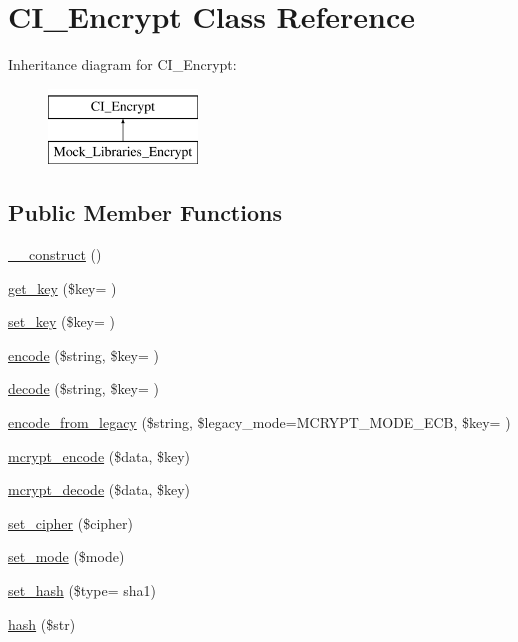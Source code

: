\hypertarget{class_c_i___encrypt}{}\section{C\+I\+\_\+\+Encrypt Class Reference}
\label{class_c_i___encrypt}
Inheritance diagram for C\+I\+\_\+\+Encrypt\+:\begin{figure}[H]
\begin{center}
\leavevmode
\includegraphics[height=2.000000cm]{class_c_i___encrypt}
\end{center}
\end{figure}
\subsection*{Public Member Functions}
\begin{DoxyCompactItemize}
\item 
\hyperlink{class_c_i___encrypt_a095c5d389db211932136b53f25f39685}{\+\_\+\+\_\+construct} ()
\item 
\hyperlink{class_c_i___encrypt_aad3fd0de27f6a67b14751b47d2471693}{get\+\_\+key} (\$key= \textquotesingle{}\textquotesingle{})
\item 
\hyperlink{class_c_i___encrypt_aec193abfe69c2cb1af185b3ca5754de3}{set\+\_\+key} (\$key= \textquotesingle{}\textquotesingle{})
\item 
\hyperlink{class_c_i___encrypt_a3d863b1bc39b9a7865d99df1cdf24df0}{encode} (\$string, \$key= \textquotesingle{}\textquotesingle{})
\item 
\hyperlink{class_c_i___encrypt_a60c68c6c16a6082e23386f9ac23518ef}{decode} (\$string, \$key= \textquotesingle{}\textquotesingle{})
\item 
\hyperlink{class_c_i___encrypt_a2dffd202d3b3968d905d1012041e6588}{encode\+\_\+from\+\_\+legacy} (\$string, \$legacy\+\_\+mode=M\+C\+R\+Y\+P\+T\+\_\+\+M\+O\+D\+E\+\_\+\+E\+C\+B, \$key= \textquotesingle{}\textquotesingle{})
\item 
\hyperlink{class_c_i___encrypt_aa1d7e40f65deb526fe4619da65c6b1ec}{mcrypt\+\_\+encode} (\$data, \$key)
\item 
\hyperlink{class_c_i___encrypt_a85f02c928abbbc5a6bf038ea5292324d}{mcrypt\+\_\+decode} (\$data, \$key)
\item 
\hyperlink{class_c_i___encrypt_a6459059d757a362410feb13d96455747}{set\+\_\+cipher} (\$cipher)
\item 
\hyperlink{class_c_i___encrypt_ab32fd90a4ac2df4be1e56460d6f6daa3}{set\+\_\+mode} (\$mode)
\item 
\hyperlink{class_c_i___encrypt_ab14b774f9fd0cc2fd082a2c44c5f9f07}{set\+\_\+hash} (\$type= \textquotesingle{}sha1\textquotesingle{})
\item 
\hyperlink{class_c_i___encrypt_aea8db0058c00fd2bc1351ddb2ebf3191}{hash} (\$str)
\end{DoxyCompactItemize}

